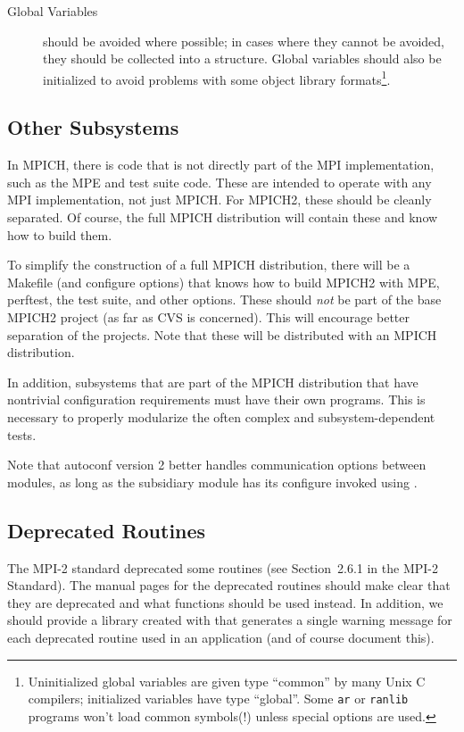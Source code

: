 \documentclass{article}
\begin{document}
\begin{description}
\item[Global Variables]should be avoided where possible; in cases
where they cannot be avoided, they should be collected into a
structure.
Global variables should also be initialized to avoid problems with
some object library formats\footnote{Uninitialized global variables
are given type ``common'' by many Unix C compilers; initialized
variables have type ``global''.  Some \texttt{ar} or \texttt{ranlib}
programs won't load common symbols(!) unless special options are used.}.
\end{description}

\subsection{Other Subsystems}
In MPICH, there is code that is not directly part of the MPI
implementation, such as the MPE and test suite code.  These are intended to
operate with any MPI implementation, not just MPICH.
For MPICH2, these should be cleanly separated.  Of course, the full MPICH
distribution will contain these and know how to build them.

To simplify the construction of a
full MPICH distribution, there will be a Makefile (and configure
options) that knows how to build MPICH2 with MPE, perftest, the test
suite, and other options.  These should \emph{not} be part of the base
MPICH2 project (as far as CVS is concerned).  This will encourage
better separation of the projects.  Note that these will be distributed with
an MPICH distribution.  

In addition, subsystems that are part of the MPICH distribution that have
nontrivial configuration requirements must have their own 
programs.  This is necessary to properly modularize the often complex and
subsystem-dependent tests.

Note that autoconf version 2 better handles communication options between
modules, as long as the subsidiary module has its configure invoked using
.  

\subsection{Deprecated Routines}

The MPI-2 standard deprecated some routines (see Section~2.6.1 in the MPI-2
Standard).  The manual pages for the deprecated routines should make clear
that they are deprecated and what functions should be used instead.  In
addition, we should provide a library created with  that
generates a single warning message for each deprecated routine used in an
application (and of course document this).
\end{document}
